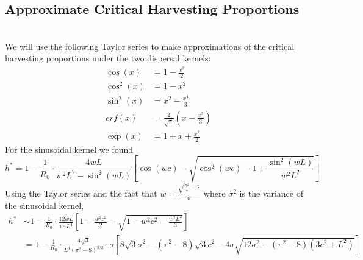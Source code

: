 \documentclass[]{article}
\begin{document}
\subsection{Approximate Critical Harvesting Proportions}
~\\We will use the following Taylor series to make approximations of the critical harvesting proportions under the two dispersal kernels:
\begin{align*}
\cos(x)&=1-\frac{x^2}{2}
\\ \cos^2(x)&=1-x^2
\\ \sin^2(x)&=x^2-\frac{x^4}{3}
\\ erf(x)&=\frac{2}{\sqrt{\pi}}(x-\frac{x^3}{3})
\\ \exp(x)&=1+x+\frac{x^2}{2}
\end{align*}
For the sinusoidal kernel we found 
\begin{equation}
h^*=1-\frac{1}{R_0}\cdot\frac{4wL}{w^2L^2-\sin^2(wL)}\left[\cos(wc)-\sqrt{\cos^2(wc)-1+\frac{\sin^2(wL)}{w^2L^2}}\right] 
\end{equation} 
Using the Taylor series and the fact that $w=\frac{\sqrt{\frac{\pi^2}{4}-2}}{\sigma}$ where $\sigma^2$ is the variance of the sinusoidal kernel,
\begin{align*}
h^*&\sim 1-\frac{1}{R_0}\cdot\frac{12wL}{w^4L^4}\left[1-\frac{w^2c^2}{2}-\sqrt{1-w^2c^2-\frac{w^2L^2}{3}}\right]
\\&=1-\frac{1}{R_0}\cdot\frac{4\sqrt{3}}{L^3(\pi^2-8)^{3/2}}\cdot\sigma\left[8\sqrt{3}\sigma^2-(\pi^2-8)\sqrt{3}c^2-4\sigma\sqrt{12\sigma^2-(\pi^2-8)(3c^2+L^2)}\right]
\end{align*}
\end{document}
